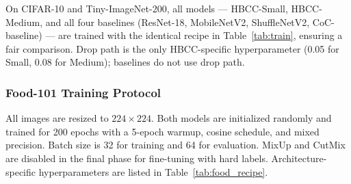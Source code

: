 \documentclass[conference]{IEEEtran}
\begin{document}
\begin{table}[h!]
  \caption{Training recipe shared by all models on CIFAR-10 and
           Tiny-ImageNet-200.}
  \label{tab:train}
  \centering
  \renewcommand{\arraystretch}{1.15}
\end{table}

On CIFAR-10 and Tiny-ImageNet-200, all models --- HBCC-Small,
HBCC-Medium, and all four baselines (ResNet-18, MobileNetV2,
ShuffleNetV2, CoC-baseline) --- are trained with the identical recipe
in Table~\ref{tab:train}, ensuring a fair comparison. Drop path is the
only HBCC-specific hyperparameter (0.05 for Small, 0.08 for Medium);
baselines do not use drop path.

\subsubsection{Food-101 Training Protocol}
\label{ssec:food_protocol}

All images are resized to $224\!\times\!224$. Both models are
initialized randomly and trained for 200 epochs with a 5-epoch warmup,
cosine schedule, and mixed precision. Batch size is 32 for training and
64 for evaluation. MixUp and CutMix are disabled in the final phase for
fine-tuning with hard labels. Architecture-specific hyperparameters are
listed in Table~\ref{tab:food_recipe}.
\end{document}
